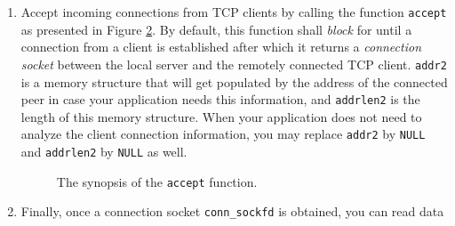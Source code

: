 \documentclass[pdftex,12pt,a4paper]{article}
\begin{document}
\begin{enumerate}
                        \ref{fig:listen}.  \texttt{sockfd} is the socket binded
                        earlier.  \texttt{backlog} is the maximum number number
                        of connections that are waiting to be accepted. Your
                        application must ensure that the backlog queue is never
                        full or new connections will get refused. At this stage
                        \texttt{netstat -lp} shall show that your application
                        is listening on the set address and port numbers.
                        \begin{figure}[tbh]
                            \centering
                            
                            \caption{The synopsis of the \texttt{listen} function.}
                            \label{fig:listen}
                        \end{figure}
                    \item Accept incoming connections from TCP clients
                        by calling the function \texttt{accept} as presented in
                        Figure \ref{fig:accept}. By default, this function
                        shall \emph{block} for until a connection from a client
                        is established after which it returns a
                        \emph{connection socket} between the local server and
                        the remotely connected TCP client. \texttt{addr2} is a
                        memory structure that will get populated by the address
                        of the connected peer in case your application needs
                        this information, and \texttt{addrlen2} is the length
                        of this memory structure. When your application does
                        not need to analyze the client connection information,
                        you may replace \texttt{addr2} by \texttt{NULL} and
                        \texttt{addrlen2} by \texttt{NULL} as well.
                        \begin{figure}[tbh]
                            \centering
                            
                            \caption{The synopsis of the \texttt{accept} function.}
                            \label{fig:accept}
                        \end{figure}
                    \item Finally, once a connection socket
                        \texttt{conn\_sockfd} is obtained, you can read data

\end{enumerate}
\end{document}
